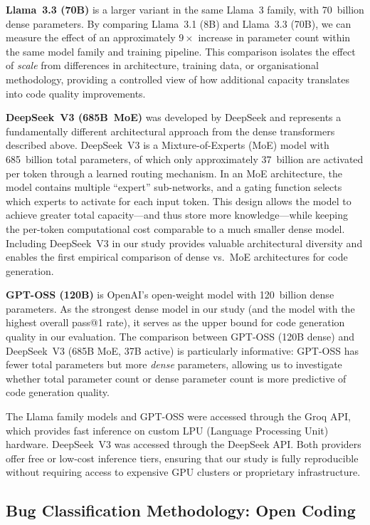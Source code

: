 \documentclass[smallextended]{svjour3}
\begin{document}
\textbf{Llama~3.3 (70B)} is a larger variant in the same Llama~3 family, with 70~billion dense parameters. By comparing Llama~3.1 (8B) and Llama~3.3 (70B), we can measure the effect of an approximately $9\times$ increase in parameter count within the same model family and training pipeline. This comparison isolates the effect of \emph{scale} from differences in architecture, training data, or organisational methodology, providing a controlled view of how additional capacity translates into code quality improvements.

\textbf{DeepSeek~V3 (685B~MoE)} was developed by DeepSeek \citep{deepseek2024v3} and represents a fundamentally different architectural approach from the dense transformers described above. DeepSeek~V3 is a Mixture-of-Experts (MoE) model with 685~billion total parameters, of which only approximately 37~billion are activated per token through a learned routing mechanism. In an MoE architecture, the model contains multiple ``expert'' sub-networks, and a gating function selects which experts to activate for each input token. This design allows the model to achieve greater total capacity---and thus store more knowledge---while keeping the per-token computational cost comparable to a much smaller dense model. Including DeepSeek~V3 in our study provides valuable architectural diversity and enables the first empirical comparison of dense vs.\ MoE architectures for code generation.

\textbf{GPT-OSS (120B)} is OpenAI's open-weight model with 120~billion dense parameters. As the strongest dense model in our study (and the model with the highest overall pass@1 rate), it serves as the upper bound for code generation quality in our evaluation. The comparison between GPT-OSS (120B dense) and DeepSeek~V3 (685B MoE, 37B active) is particularly informative: GPT-OSS has fewer total parameters but more \emph{dense} parameters, allowing us to investigate whether total parameter count or dense parameter count is more predictive of code generation quality.

The Llama family models and GPT-OSS were accessed through the Groq API, which provides fast inference on custom LPU (Language Processing Unit) hardware. DeepSeek~V3 was accessed through the DeepSeek API. Both providers offer free or low-cost inference tiers, ensuring that our study is fully reproducible without requiring access to expensive GPU clusters or proprietary infrastructure.

\subsection{Bug Classification Methodology: Open Coding}
\label{sec:classification_method}
\end{document}
